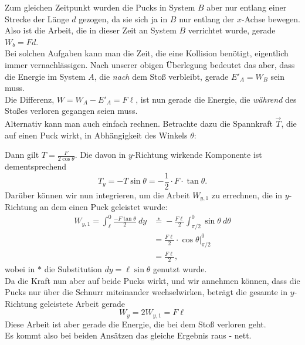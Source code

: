 \begin{Answer}[ref = pucks]
Zum gleichen Zeitpunkt wurden die Pucks in System $B$ aber nur entlang einer Strecke der Länge $d$ gezogen, da sie sich ja in $B$ nur entlang der $x$-Achse bewegen. Also ist die Arbeit, die in dieser Zeit an System $B$ verrichtet wurde, gerade $W_b = Fd$.\\
Bei solchen Aufgaben kann man die Zeit, die eine Kollision benötigt, eigentlich immer vernachlässigen. Nach unserer obigen Überlegung bedeutet das aber, dass die Energie im System $A$, die \textit{nach} dem Stoß verbleibt, gerade $E'_A = W_B$ sein muss.\\
Die Differenz, $\boxed{W = W_A-E'_A = F\ell}$, ist nun gerade die Energie, die \textit{während} des Stoßes verloren gegangen seien muss.\\
Alternativ kann man auch einfach rechnen.  Betrachte dazu die Spannkraft $\vec{T}$, die auf einen Puck wirkt, in Abhängigkeit des Winkels $\theta$:
\begin{figure}[h]
	\centering
{}
\end{figure}
Dann gilt  $T = \frac{F}{2\cos \theta}.$
Die davon in $y$-Richtung wirkende Komponente ist dementsprechend 
\begin{equation}
	T_y = -T \sin \theta = -\frac{1}{2}\cdot F\cdot \tan\theta.
\end{equation}
Darüber können wir nun integrieren, um die Arbeit $W_{y,1}$ zu errechnen, die in $y$-Richtung an dem einen Puck geleistet wurde:
\begin{align*}
	W_{y,1} = \int_{\ell}^0 \frac{-F\tan \theta}{2}~dy
	&\overset{\ast}{=} -\frac{F\ell}{2}\int_{\pi/2}^{0} \sin \theta ~d\theta\\
	&= \frac{F\ell}{2}\cdot \left. \cos \theta \right|_{\pi/2}^{0}\\
	&= \frac{F\ell}{2}, 
\end{align*}
wobei in $\ast$ die Substitution $dy = \ell \sin \theta$ genutzt wurde.\\
Da die Kraft nun aber auf beide Pucks wirkt, und wir annehmen können, dass die Pucks nur über die Schnurr miteinander wechselwirken, beträgt die gesamte in $y$-Richtung geleistete Arbeit gerade
\begin{equation*}
	\boxed{ W_y = 2W_{y,1} = F\ell }
\end{equation*}
Diese Arbeit ist aber gerade die Energie, die bei dem Stoß verloren geht.\\
Es kommt also bei beiden Ansätzen das gleiche Ergebnis raus - nett.

\end{Answer}